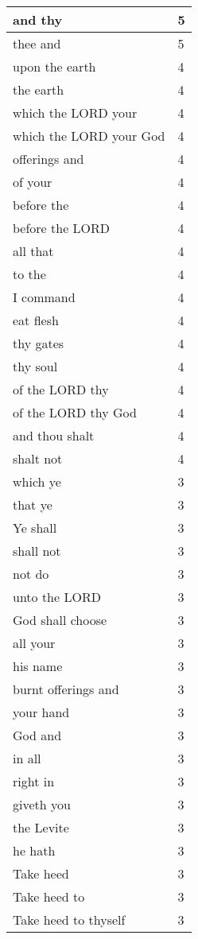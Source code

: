 \begin{center}
\begin{longtable}{|p{3.0in}|p{0.5in}|}
and thy & 5\\ \hline 
thee and & 5\\ \hline 
upon the earth & 4\\ \hline 
the earth & 4\\ \hline 
which the LORD your & 4\\ \hline 
which the LORD your God & 4\\ \hline 
offerings and & 4\\ \hline 
of your & 4\\ \hline 
before the & 4\\ \hline 
before the LORD & 4\\ \hline 
all that & 4\\ \hline 
to the & 4\\ \hline 
I command & 4\\ \hline 
eat flesh & 4\\ \hline 
thy gates & 4\\ \hline 
thy soul & 4\\ \hline 
of the LORD thy & 4\\ \hline 
of the LORD thy God & 4\\ \hline 
and thou shalt & 4\\ \hline 
shalt not & 4\\ \hline 
which ye & 3\\ \hline 
that ye & 3\\ \hline 
Ye shall & 3\\ \hline 
shall not & 3\\ \hline 
not do & 3\\ \hline 
unto the LORD & 3\\ \hline 
God shall choose & 3\\ \hline 
all your & 3\\ \hline 
his name & 3\\ \hline 
burnt offerings and & 3\\ \hline 
your hand & 3\\ \hline 
God and & 3\\ \hline 
in all & 3\\ \hline 
right in & 3\\ \hline 
giveth you & 3\\ \hline 
the Levite & 3\\ \hline 
he hath & 3\\ \hline 
Take heed & 3\\ \hline 
Take heed to & 3\\ \hline 
Take heed to thyself & 3\\ \hline 

\end{longtable}
\end{center}

